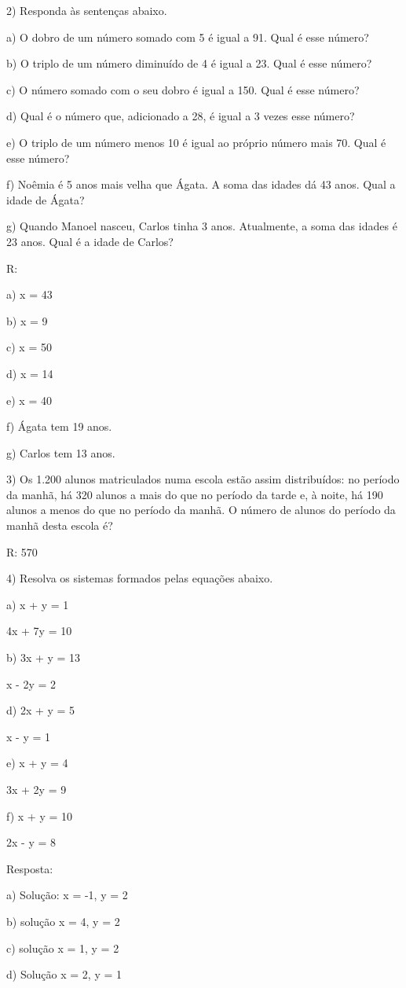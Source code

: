 2) Responda às sentenças abaixo.

a) O dobro de um número somado com 5 é igual a 91. Qual é esse número?

b) O triplo de um número diminuído de 4 é igual a 23. Qual é esse
número?

c) O número somado com o seu dobro é igual a 150. Qual é esse número?

d) Qual é o número que, adicionado a 28, é igual a 3 vezes esse número?

e) O triplo de um número menos 10 é igual ao próprio número mais 70.
Qual é esse número?

f) Noêmia é 5 anos mais velha que Ágata. A soma das idades dá 43 anos.
Qual a idade de Ágata?

g) Quando Manoel nasceu, Carlos tinha 3 anos. Atualmente, a soma das
idades é 23 anos. Qual é a idade de Carlos?

R:

a) x = 43

b) x = 9

c) x = 50

d) x = 14

e) x = 40

f) Ágata tem 19 anos.

g) Carlos tem 13 anos.

3) Os 1.200 alunos matriculados numa escola estão assim distribuídos: no
período da manhã, há 320 alunos a mais do que no período da tarde e, à
noite, há 190 alunos a menos do que no período da manhã. O número de
alunos do período da manhã desta escola é?

R: 570

4) Resolva os sistemas formados pelas equações abaixo.

a) x + y = 1

4x + 7y = 10

b) 3x + y = 13

x - 2y = 2

d) 2x + y = 5

x - y = 1

e) x + y = 4

3x + 2y = 9

f) x + y = 10

2x - y = 8

Resposta:

a) Solução: x = -1, y = 2

b) solução x = 4, y = 2

c) solução x = 1, y = 2

d) Solução x = 2, y = 1

